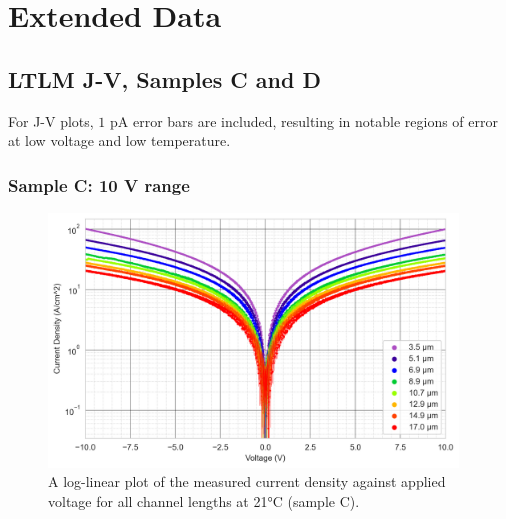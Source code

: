 \chapter{Extended Data}

\section{LTLM J-V, Samples C and D}
For J-V plots, $1$ \si{\pico\ampere} error bars are included, resulting in notable regions of error at low voltage and low temperature.
\label{app:LTLM_J_V_data}
\subsection{Sample C: 10 \si{\volt} range}
\label{app:J_V_sample_C}
\begin{figure}[h]
    \centering
    \includegraphics[width=0.97\textwidth]{Chapter3/Figs/Raster/Sample C 2019/10V_Current_Density_vs_Voltage_Temperature_21_log.png}
    \caption{A log-linear plot of the measured current density against applied voltage for all channel lengths at 21\si{\degreeCelsius} (sample C).}
    \label{appfig:current_density_21}
\end{figure}


